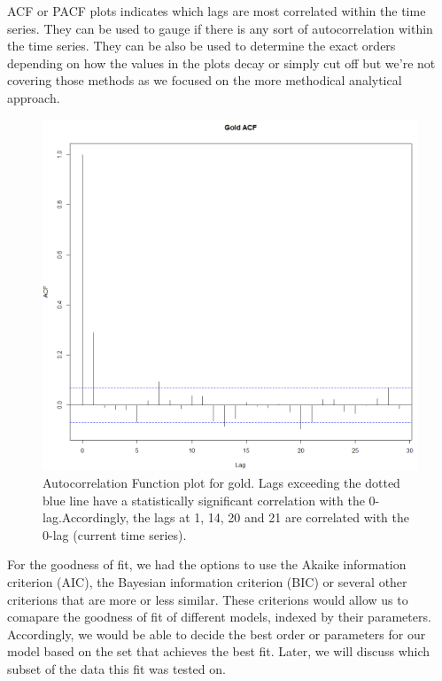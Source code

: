 ACF or PACF plots indicates which lags are most correlated within the time series. They can be used to gauge if there is any sort of autocorrelation within the time series. They can be also be used to determine the exact orders depending on how the values in the plots decay or simply cut off but we're not covering those methods as we focused on the more methodical analytical approach.
\begin{figure}[ht]
	\vskip 0.2in
	\begin{center}
		\centerline{\includegraphics[width=\columnwidth]{ACF.PNG}}
		\caption{Autocorrelation Function plot for gold. Lags exceeding the dotted blue line have a statistically significant correlation with the 0-lag.Accordingly, the lags at 1, 14, 20 and 21 are correlated with the 0-lag (current time series).}
	\end{center}
	\vskip -0.2in
	\label{fig:ACF}
\end{figure}
For the goodness of fit, we had the options to use the Akaike information criterion (AIC), the Bayesian information criterion (BIC) or several other criterions that are more or less similar. These criterions would allow us to comapare the goodness of fit of different models, indexed by their parameters. Accordingly, we would be able to decide the best order or parameters for our model based on the set that achieves the best fit. Later, we will discuss which subset of the data this fit was tested on.
